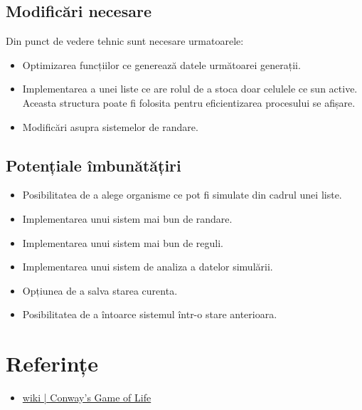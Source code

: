 \documentclass[11pt ,A4]{article}
\begin{document}
            \subsection{Modificări necesare}
                Din punct de vedere tehnic sunt necesare urmatoarele:
                \begin{itemize}
                    \item Optimizarea funcțiilor ce generează datele următoarei generații.
                    \item Implementarea a unei liste ce are rolul de a stoca doar celulele ce sun active.
                          Aceasta structura poate fi folosita pentru eficientizarea procesului se afișare.
                    \item Modificări asupra sistemelor de randare.
                \end{itemize}


            \subsection{Potențiale îmbunătățiri}
                
                \begin{itemize}
                    \item Posibilitatea de a alege organisme ce pot fi simulate din cadrul unei liste.
                    \item Implementarea unui sistem mai bun de randare.
                    \item Implementarea unui sistem mai bun de reguli.
                    \item Implementarea unui sistem de analiza a datelor simulării.
                    \item Opțiunea de a salva starea curenta.
                    \item Posibilitatea de a întoarce sistemul într-o stare anterioara.
                \end{itemize}
                
             
    \section{Referințe}

        \begin{itemize}
            \item \href{https://en.wikipedia.org/wiki/Conway%27s_Game_of_Life}{wiki | Conway's Game of Life}
        \end{itemize}
\end{document}
